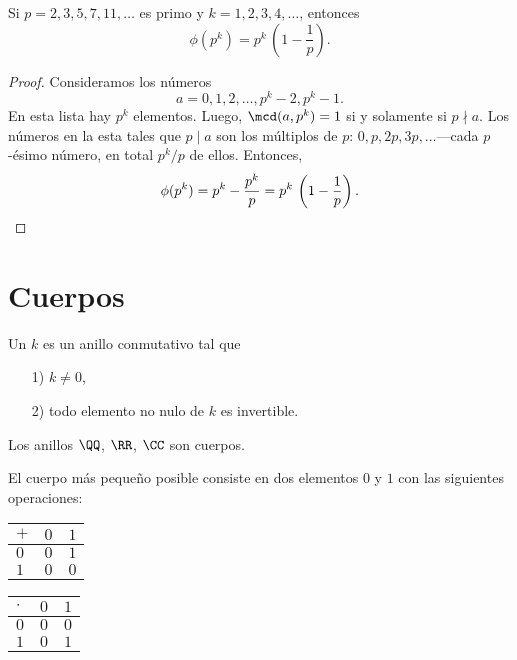 \begin{proposicion}
  Si $p = 2,3,5,7,11,\ldots$ es primo y $k = 1,2,3,4,\ldots$, entonces
  $$\phi (p^k) = p^k\,\left(1 - \frac{1}{p}\right).$$

  \begin{proof}
    Consideramos los números
    $$a = 0, 1, 2, \ldots, p^k-2, p^k-1.$$
    En esta lista hay $p^k$ elementos. Luego, $\mcd (a,p^k) = 1$ si y solamente
    si $p\nmid a$. Los números en la esta tales que $p\mid a$ son los múltiplos
    de $p$: $0, p, 2p, 3p, \ldots$---cada $p$-ésimo número, en total $p^k / p$
    de ellos. Entonces,
    \[ \phi (p^k) = p^k - \frac{p^k}{p} = p^k\,\left(1 - \frac{1}{p}\right). \qedhere \]
  \end{proof}
\end{proposicion}


\section{Cuerpos}

\begin{definicion}
  Un  $k$ es un anillo conmutativo tal que

  \begin{enumerate}
  \item[1)] $k \ne 0$,

  \item[2)] todo elemento no nulo de $k$ es invertible.
  \end{enumerate}
\end{definicion}

\begin{ejemplo}
  Los anillos $\QQ$, $\RR$, $\CC$ son cuerpos.
\end{ejemplo}

\begin{ejemplo}
  El cuerpo más pequeño posible consiste en dos elementos $0$ y $1$ con las
  siguientes operaciones:

  \begin{center}
    \begin{tabular}{f{0.5cm}|f{0.5cm}f{0.5cm}}
      $+$ & $0$ & $1$ \tabularnewline
      \hline
      $0$ & $0$ & $1$ \tabularnewline
      $1$ & $0$ & $0$
    \end{tabular}
    \quad\quad
    \begin{tabular}{f{0.5cm}|f{0.5cm}f{0.5cm}}
      $\cdot$ & $0$ & $1$ \tabularnewline
      \hline
      $0$ & $0$ & $0$ \tabularnewline
      $1$ & $0$ & $1$
    \end{tabular}
  \end{center}
\end{ejemplo}


